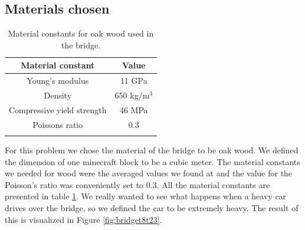\subsection{Materials chosen}
\begin{table}
\center
\caption{Material constants for oak wood used in the bridge.} 
\begin{tabular}{cc}
Material constant & Value \\ 
\hline 
Young's modulus & 11 GPa \\ 
Density & 650 kg/m$^3$ \\ 
Compressive yield strength & 46 MPa \\ 
Poissons ratio & 0.3 \\ 
\label{tab:oak}
\end{tabular}
\end{table}


For this problem we chose the material of the bridge to be oak wood. We defined the dimension of one minecraft block to be a cubic meter. The material constants we needed for wood were the averaged values we found at \cite{oak} and the value for the Poisson's ratio was conveniently set to 0.3. All the material constants are presented in table \ref{tab:oak}. We really wanted to see what happens when a heavy car drives over the bridge, so we defined the car to be extremely heavy. The result of this is visualized in Figure \ref{fig:bridget8t23}.




